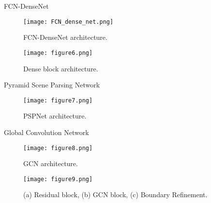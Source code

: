 \documentclass[10pt,aspectratio=169]{beamer} %
\newcounter{angle}
\begin{document}
\begin{frame}{FCN-DenseNet}
	\begin{minipage}[c]{0.48\textwidth}
		\begin{figure} [h!]
			\texttt{[image: FCN\_dense\_net.png]}
			\caption{FCN-DenseNet architecture.} 
			\label{fcn}
		\end{figure}
	\end{minipage}
	\hfill
	\begin{minipage}[c]{0.48\textwidth}
		\begin{figure} [h!]
			\centering
			\texttt{[image: figure6.png]}
			\caption{Dense block architecture.} 
		\end{figure}
	\end{minipage}
\end{frame}

\begin{frame}{Pyramid Scene Parsing Network}
	\begin{figure} [h!]
		\centering
		\texttt{[image: figure7.png]}
		\caption{PSPNet architecture.} 
	\end{figure}
\end{frame}

\begin{frame}{Global Convolution Network}
		\begin{minipage}[c]{0.55\textwidth}
			\begin{figure} [h!]
				\centering
				\texttt{[image: figure8.png]}
				\caption{GCN architecture.} 
			\end{figure}	
		\end{minipage}
	\hfill
	\begin{minipage}[c]{0.35\textwidth}
		\begin{figure} [h!]
			\centering
			\texttt{[image: figure9.png]}
			\caption{(a) Residual block, (b) GCN block, (c) Boundary Refinement.} 
		\end{figure}	
	\end{minipage}

\end{frame}
\end{document}
